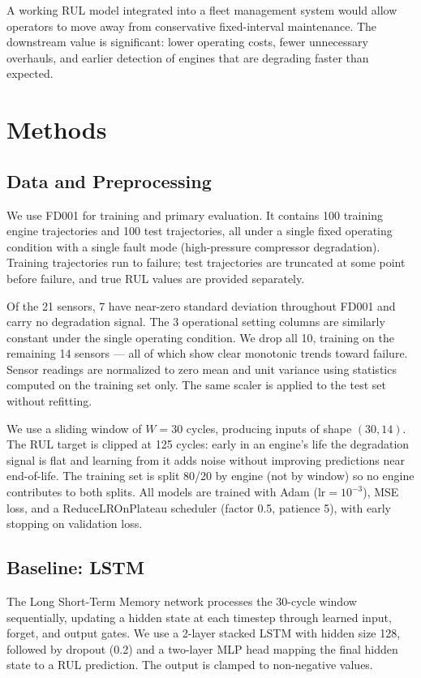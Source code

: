 \documentclass{article}
\begin{document}
A working RUL model integrated into a fleet management system would allow operators to move away from conservative fixed-interval maintenance. The downstream value is significant: lower operating costs, fewer unnecessary overhauls, and earlier detection of engines that are degrading faster than expected.


\section{Methods}

\subsection*{Data and Preprocessing}

We use FD001 for training and primary evaluation. It contains 100 training engine trajectories and 100 test trajectories, all under a single fixed operating condition with a single fault mode (high-pressure compressor degradation). Training trajectories run to failure; test trajectories are truncated at some point before failure, and true RUL values are provided separately.

Of the 21 sensors, 7 have near-zero standard deviation throughout FD001 and carry no degradation signal. The 3 operational setting columns are similarly constant under the single operating condition. We drop all 10, training on the remaining 14 sensors — all of which show clear monotonic trends toward failure. Sensor readings are normalized to zero mean and unit variance using statistics computed on the training set only. The same scaler is applied to the test set without refitting.

We use a sliding window of $W = 30$ cycles, producing inputs of shape $(30, 14)$. The RUL target is clipped at 125 cycles: early in an engine's life the degradation signal is flat and learning from it adds noise without improving predictions near end-of-life. The training set is split 80/20 by engine (not by window) so no engine contributes to both splits. All models are trained with Adam ($\text{lr} = 10^{-3}$), MSE loss, and a ReduceLROnPlateau scheduler (factor 0.5, patience 5), with early stopping on validation loss.

\subsection*{Baseline: LSTM}

The Long Short-Term Memory network \citep{hochreiter1997long} processes the 30-cycle window sequentially, updating a hidden state at each timestep through learned input, forget, and output gates. We use a 2-layer stacked LSTM with hidden size 128, followed by dropout (0.2) and a two-layer MLP head mapping the final hidden state to a RUL prediction. The output is clamped to non-negative values.
\end{document}
